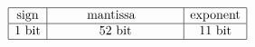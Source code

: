 

\[
\begin{array}{|c|c|c|}
   \hline
   \makebox{sign} & \ \ \ \ \ \ \ \ \makebox{mantissa} \ \ \ \ \ \ \ \ \ \
                  & \makebox{exponent}\\
   \hline
   \makebox{1 bit} & \makebox{52 bit} & \makebox{11 bit} \\
   \hline
\end{array}
\]


